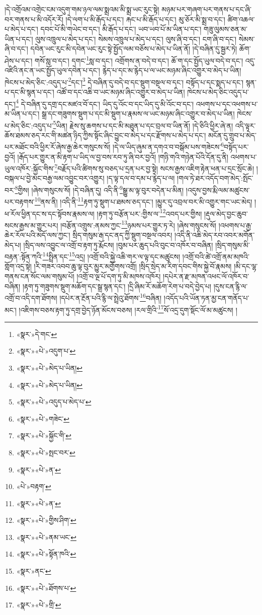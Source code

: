 །དེ་འགྲོའམ་འགྲེང་ངམ་འདུག་གམ་ཉལ་ལམ་སྨྲའམ་མི་སྨྲ་ཡང་རུང་སྟེ། མཉམ་པར་གཞག་པར་གནས་པ་དང་ཞི་བར་གནས་པ་མི་འདོར་རོ། །དེ་ལག་པ་མི་རྒོད་པ་དང་། རྐང་པ་མི་རྒོད་པ་དང་། མུ་ཅོར་མི་སྨྲ་བ་དང་། ཚིག་འཆལ་པ་མེད་པ་དང་། དབང་པོ་མི་གཡེང་བ་དང་། མི་རྒོད་པ་དང་། ཡབ་ཡབ་པོ་མ་ཡིན་པ་དང་། གཟུ་ལུམས་ཅན་མ་ཡིན་པ་དང་། ལུས་འཁྲུལ་པ་མེད་པ་དང་། སེམས་འཁྲུལ་པ་མེད་པ་དང་། ལུས་ཞི་བ་དང་། ངག་ཞི་བ་དང་། སེམས་ཞི་བ་དང་། དབེན་ཡང་རུང་མི་དབེན་ཡང་རུང་སྟེ་སྤྱོད་ལམ་བཅོས་པ་མེད་པ་ཡིན་ནོ། །དེ་བཞིན་དུ་སྦྱར་ཏེ། ཆོག་ཤེས་པ་དང་། གསོ་སླ་བ་དང་། དགང་\footnote{«སྣར་»དེ་གང་}སླ་བ་དང་། འགྲོགས་ན་བདེ་བ་དང་། ཆོ་ག་དང་སྤྱོད་ཡུལ་བདེ་བ་དང་། འདུ་འཛིའི་ནང་ན་ཡང་སྤྱོད་ཡུལ་དབེན་པ་དང་། རྙེད་པ་དང་མ་རྙེད་པ་ལ་ཡང་མཉམ་ཞིང་འགྱུར་བ་མེད་པ་ཡིན། ཁེངས་པ་མེད་ཅིང་:འདུད་པ་\footnote{«སྣར་»«པེ་»འདུག་པ་}དང་།\footnote{«སྣར་»«པེ་»མེད་པ་ཡིན།} དེ་བཞིན་དུ་བདེ་བ་དང་སྡུག་བསྔལ་བ་དང་། བསྟོད་པ་དང་སྨད་པ་དང་། སྙན་པ་དང་མི་སྙན་པ་དང་། འཚོ་བ་དང་འཆི་བ་ཡང་མཉམ་ཞིང་འགྱུར་བ་མེད་པ་ཡིན། ཁེངས་པ་མེད་ཅིང་འདུད་པ་དང་།\footnote{«སྣར་»«པེ་»མེད་པ་ཡིན།} དེ་བཞིན་དུ་དགྲ་དང་མཛའ་བོ་དང་། ཡིད་དུ་འོང་བ་དང་ཡིད་དུ་མི་འོང་བ་དང་། འཕགས་པ་དང་འཕགས་པ་མ་ཡིན་པ་དང་། སྒྲ་དང་གཟུགས་སྡུག་པ་དང་མི་སྡུག་པ་རྣམས་ལ་ཡང་མཉམ་ཞིང་འགྱུར་བ་མེད་པ་ཡིན། ཁེངས་པ་མེད་ཅིང་:འདུད་པ་\footnote{«སྣར་»«པེ་»འདུད་པ་མེད་པ་}ཡིན། རྗེས་སུ་ཆགས་པ་དང་མི་མཐུན་པ་དང་བྲལ་བ་ཡིན་ནོ། །དེ་ཅིའི་ཕྱིར་ཞེ་ན། འདི་ལྟར་ཆོས་ཐམས་ཅད་རང་གི་མཚན་ཉིད་ཀྱིས་སྟོང་ཞིང་བྱུང་བ་མེད་པ་དང་རྫོགས་པ་མེད་པ་དང་། མངོན་དུ་གྲུབ་པ་མེད་པར་མཐོང་བའི་ཕྱིར་རོ་ཞེས་རྒྱ་ཆེར་གསུངས་སོ། །དེ་ལ་ཡིད་ཞུམ་ན་དགའ་བ་བསྒོམ་པས་གཟེངས་\footnote{«སྣར་»«པེ་»གཟེང་}བསྟོད་པར་བྱའོ། །རྒོད་པར་གྱུར་ན་མི་རྟག་པ་ཡིད་ལ་བྱ་བས་རབ་ཏུ་ཞི་བར་བྱའོ། །གཉི་གའི་གཉེན་པོའི་དོན་དུ་ནི། འཕགས་པ་ཡུལ་འཁོར་:སྐྱོང་གིས་\footnote{«སྣར་»«པེ་»སྐྱོང་གི་}བརྗོད་པའི་ཚིགས་སུ་བཅད་པ་དྲན་པར་བྱ་སྟེ། སངས་རྒྱས་འཇིག་རྟེན་ཕན་པ་དྲང་སྲོང་ཆེ། །བསྐལ་པ་བྱེ་མང་བརྒྱ་ལམ་འབྱུང་བར་འགྱུར། །ད་ལྟ་དལ་བ་དམ་པ་རྙེད་པ་ལ། །གལ་ཏེ་ཐར་འདོད་བག་མེད་:སྤོང་བར་\footnote{«སྣར་»«པེ་»སྤང་བར་}གྱིས། །ཞེས་གསུངས་སོ། །དེ་བཞིན་དུ། འདི་ནི་\footnote{«སྣར་»«པེ་»ན་}སྒྱུ་མ་ལྟ་བུར་བདེན་པ་མིན། །འདུས་བྱས་རྨི་ལམ་མཚུངས་པར་བརྟགས་\footnote{«པེ་»བརྟག་}ནས་ནི། །འདི་ནི་\footnote{«སྣར་»«པེ་»ན་}རྟག་ཏུ་སྡུག་པ་ཐམས་ཅད་དང་། །མྱུར་དུ་འབྲལ་བར་མི་འགྱུར་གང་ཡང་མེད། །ཕ་རོལ་ཕྱིན་དང་ས་དང་སྟོབས་རྣམས་ལ། །རྟག་ཏུ་བརྩོན་པར་:གྱིས་ལ་\footnote{«སྣར་»«པེ་»གྱིས་ཤིག་}འབད་པར་གྱིས། །རྡུལ་མེད་བྱང་ཆུབ་སངས་རྒྱས་མ་གྱུར་པར། །བརྩོན་འགྲུས་:ནམས་ཀྱང་\footnote{«སྣར་»«པེ་»ནམ་ཡང་}ཉམས་པར་གྱུར་ཏ་རེ། །ཞེས་གསུངས་སོ། །འཕགས་པ་རྒྱ་ཆེར་རོལ་པའི་མདོ་ལས་ཀྱང་། སྲིད་གསུམ་རྒ་དང་ནད་ཀྱི་སྡུག་བསྔལ་འབར། །འདི་ནི་འཆི་མེད་རབ་འབར་མགོན་མེད་པ། །སྲིད་ལས་འབྱུང་ལ་འགྲོ་བ་རྟག་ཏུ་རྨོངས། །བུམ་པར་ཆུད་པའི་བུང་བ་འཁོར་བ་བཞིན། །སྲིད་གསུམ་མི་བརྟན་:སྟོན་ཀའི་\footnote{«སྣར་»«པེ་»སྟོན་ཁའི་}སྤྲིན་དང་\footnote{«སྣར་»ནང་}འདྲ། །འགྲོ་བའི་སྐྱེ་འཆི་གར་ལ་ལྟ་དང་མཚུངས། །འགྲོ་བའི་ཚེ་འགྲོ་ནམ་མཁའི་གློག་འདྲ་སྟེ། །རི་གཟར་འབབ་ཆུ་ལྟ་བུར་མྱུར་མགྱོགས་འགྲོ། །སྲིད་སྲེད་མ་རིག་དབང་གིས་སྐྱེ་བོ་རྣམས། །མི་དང་ལྷ་གནས་ངན་སོང་ལམ་གསུམ་པོ། །འགྲོ་བ་ལྔ་པོ་དག་ཏུ་མི་མཁས་འཁོར། །དཔེར་ན་རྫ་མཁན་འཕང་ལོ་འཁོར་བ་བཞིན། །རྟག་ཏུ་གཟུགས་སྡུག་མཆོག་དང་སྒྲ་སྙན་དང་། །དྲི་ཞིམ་རོ་མཆོག་རེག་པ་བདེ་བྱེད་པ། །དུས་ངན་རྙི་ལ་འགྲོ་བ་འདི་དག་ཐོགས། །དཔེར་ན་རྔོན་པའི་རྙི་ལ་སྤྲེའུ་ཐོགས་\footnote{«སྣར་»«པེ་»ཐོགས་པ་}བཞིན། །འདོད་པའི་ཡོན་ཏན་མྱ་ངན་གནོད་པ་མང་། །འཇིགས་བཅས་རྟག་ཏུ་དགྲ་བྱེད་ཉོན་མོངས་བཅས། །རལ་གྲིའི་\footnote{«སྣར་»«པེ་»གྲི་}སོ་འདྲ་དུག་སྡོང་ལོ་མ་མཚུངས། །

